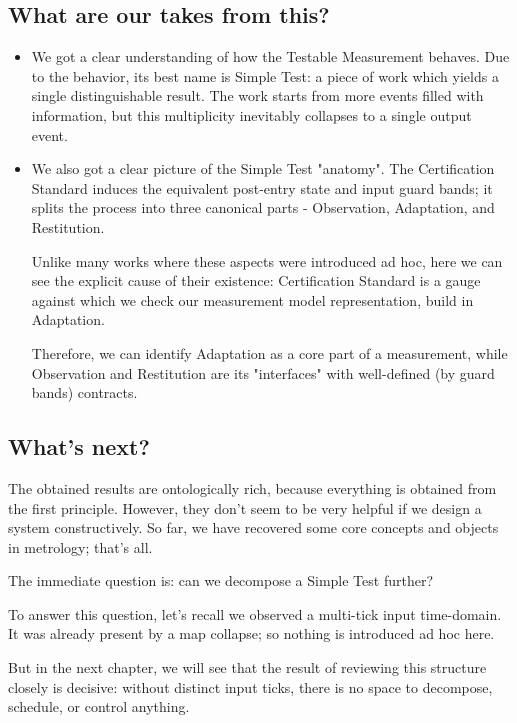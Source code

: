 \documentclass[12pt]{article}
\begin{document}
\subsection{What are our takes from this?}
\begin{itemize}
    \item We got a clear understanding of how the Testable Measurement behaves. Due to the behavior, its best name is Simple Test: a piece of work which yields a single distinguishable result. The work starts from more events filled with information, but this multiplicity inevitably collapses to a single output event.
    \item We also got a clear picture of the Simple Test "anatomy". The Certification Standard induces the equivalent post-entry state and input guard bands; it splits the process into three canonical parts - Observation, Adaptation, and Restitution. 
    
    Unlike many works where these aspects were introduced ad hoc, here we can see the explicit cause of their existence: Certification Standard is a gauge against which we check our measurement model representation, build in Adaptation. 
    
    Therefore, we can identify Adaptation as a core part of a measurement, while Observation and Restitution are its "interfaces" with well-defined (by guard bands) contracts.
\end{itemize}

\subsection{What's next?}

The obtained results are ontologically rich, because everything is obtained from the first principle. However, they don't seem to be very helpful if we design a system constructively. So far, we have recovered some core concepts and objects in metrology; that's all.

The immediate question is: can we decompose a Simple Test further?

To answer this question, let's recall we observed a multi-tick input time-domain. It was already present by a map collapse; so nothing is introduced ad hoc here. 

But in the next chapter, we will see that the result of reviewing this structure closely is decisive: without distinct input ticks, there is no space to decompose, schedule, or control anything.
\end{document}
